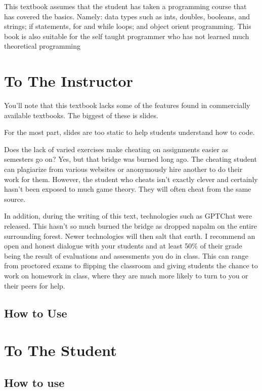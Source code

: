 This textbook assumes that the student has taken a programming course that has covered the basics.
Namely: data types such as ints, doubles, booleans, and strings; if statements, for and while loops; and object orient programming.
This book is also suitable for the self taught programmer who has not learned much theoretical programming

\section{To The Instructor}

You'll note that this textbook lacks some of the features found in commercially available textbooks.  The biggest of these is slides.  



For the most part, slides are too static to help students understand how to code. 



Does the lack of varied exercises make cheating on assignments easier as semesters go on?  Yes, but that bridge was burned long ago.  
The cheating student can plagiarize from various websites or anonymously hire another to do their work for them.
However, the student who cheats isn't exactly clever and certainly hasn't been exposed to much game theory.  
They will often cheat from the same source.  

In addition, during the writing of this text, technologies such as GPTChat were released.  This hasn't so much burned the bridge as dropped napalm on the entire surrounding forest.  Newer technologies will then salt that earth. I recommend an open and honest dialogue with your students and at least 50\% of their grade being the result of evaluations and assessments you do in class.  This can range from proctored exams to flipping the classroom and giving students the chance to work  on homework in class, where they are much more likely to turn to you or their peers for help.

\subsection{How to Use}

\section{To The Student}


\subsection{How to use}



